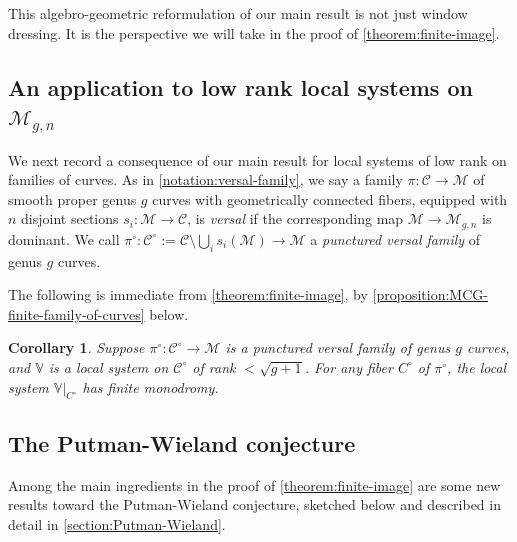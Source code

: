 \documentclass[12 pt]{amsart}
\theoremstyle{plain}
\newtheorem{corollary}[subsubsection]{Corollary}
\theoremstyle{definition}
\theoremstyle{remark}
\numberwithin{equation}{section}
\begin{document}
This algebro-geometric reformulation of our main result is not just window
dressing. It is the perspective we will take in the proof of \autoref{theorem:finite-image}. 

\subsection{An application to low rank local systems on $\mathscr M_{g,n}$}

We next record a consequence of our main result for local systems of low rank on families of curves.
As in \autoref{notation:versal-family}, we say a family $\pi:\mathscr C \to \mathscr M$ of smooth proper genus
$g$ curves with geometrically connected fibers, equipped with $n$ disjoint sections $s_i: \mathscr M \to
\mathscr C$, is {\em versal} if the corresponding map $\mathscr M \to \mathscr M_{g,n}$
is dominant. We call 
$\pi^\circ: \mathscr C^\circ := \mathscr C \setminus \bigcup_i s_i(\mathscr M)\to \mathscr
M$ a {\em punctured versal family} of genus $g$ curves.

The following is immediate from \autoref{theorem:finite-image}, by \autoref{proposition:MCG-finite-family-of-curves} below.
\begin{corollary}
	\label{corollary:}
	Suppose $\pi^\circ: \mathscr C^\circ \to \mathscr M$
	is a punctured versal family of genus $g$ curves,
	and $\mathbb V$ is a local system on $\mathscr C^\circ$ of rank $<
	\sqrt{g+1}$.
	For any fiber $C^\circ$ of $\pi^\circ$, the local system $\mathbb
	V|_{C^\circ}$ has finite monodromy.
\end{corollary}

\subsection{The Putman-Wieland conjecture}
\label{subsection:intro-putman-wieland}

Among the main ingredients in the proof of \autoref{theorem:finite-image} are some new results toward the Putman-Wieland conjecture, sketched below and
described in detail in \autoref{section:Putman-Wieland}.
\end{document}
